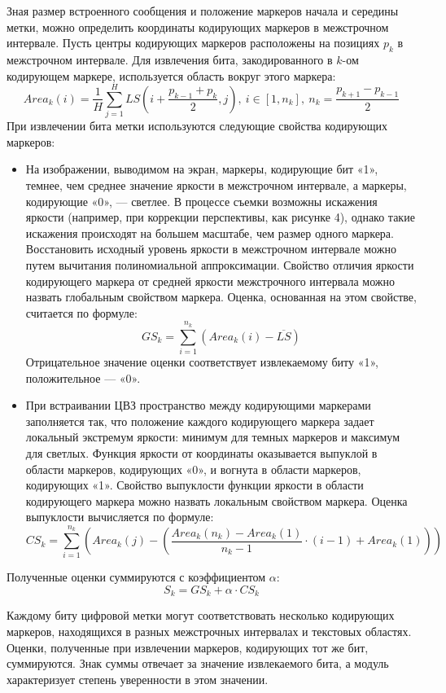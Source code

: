 \documentclass[12pt,a4paper]{article}
\begin{document}
Зная размер встроенного сообщения и положение маркеров начала и середины метки, можно определить координаты кодирующих маркеров в межстрочном интервале.
Пусть центры кодирующих маркеров расположены на позициях $p_k$ в межстрочном интервале.
Для извлечения бита, закодированного в $k$-ом  кодирующем маркере, используется область вокруг этого маркера:
$${Area}_k(i) = \frac{1}{H}\sum_{j=1}^HLS\left(i+ \frac{p_{k-1}+p_{k}}{2},j\right),\  i\in\left[1,n_k\right],\ n_k=\frac{p_{k+1}-p_{k-1}}{2}$$
При извлечении бита метки используются следующие свойства кодирующих маркеров:
\begin{itemize}
\item
На изображении, выводимом на экран, маркеры, кодирующие бит «1», темнее, чем среднее значение яркости в межстрочном интервале, а маркеры, кодирующие «0», — светлее.
В процессе съемки возможны искажения яркости (например, при коррекции перспективы, как рисунке 4), однако такие искажения происходят на большем масштабе, чем размер одного маркера.
Восстановить исходный уровень яркости в межстрочном интервале можно путем вычитания полиномиальной аппроксимации.
Свойство отличия яркости кодирующего маркера от средней яркости межстрочного интервала можно назвать глобальным свойством маркера.
Оценка, основанная на этом свойстве, считается по формуле:
$$GS_k = \sum_{i=1}^{n_k} \left(Area_k(i)-\overline{LS}\right)$$
Отрицательное значение оценки соответствует извлекаемому биту «1», положительное — «0».
\item
При встраивании ЦВЗ пространство между кодирующими маркерами заполняется так, что положение каждого кодирующего маркера задает локальный экстремум яркости: минимум для темных маркеров и максимум для светлых.
Функция яркости от координаты оказывается выпуклой в области маркеров, кодирующих «0», и вогнута в области маркеров, кодирующих «1».
Свойство выпуклости функции яркости в области кодирующего маркера можно назвать локальным свойством маркера.
Оценка выпуклости вычисляется по формуле:
$$CS_k=\sum_{i=1}^{n_k}\left(Area_k(j)-\left(\frac{Area_k(n_k)-Area_k(1)}{n_k-1}\cdot (i-1) + Area_k(1)\right)\right)$$
\end{itemize}
Полученные оценки суммируются с коэффициентом $\alpha$:
$$S_k = {GS}_k +\alpha \cdot {CS}_k$$

Каждому биту цифровой метки могут соответствовать несколько кодирующих маркеров, находящихся в разных межстрочных интервалах и текстовых областях.
Оценки, полученные при извлечении маркеров, кодирующих тот же бит,  суммируются.
Знак суммы отвечает за значение извлекаемого бита, а модуль характеризует степень уверенности в этом значении.
\newpage
\end{document}

